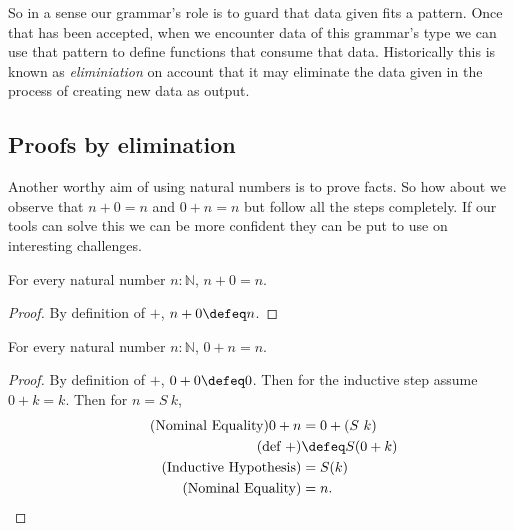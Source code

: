 So in a sense our grammar's role is to guard that data given fits 
a pattern.  Once that has been accepted, when we encounter data 
of this grammar's type we can use that pattern to define functions 
that consume that data.  Historically this is known as \emph{eliminiation}
on account that it may eliminate the data given in the process of 
creating new data as output.

\subsection{Proofs by elimination}
Another worthy aim of using natural numbers is to prove facts.
So how about we observe that $n+0=n$ and $0+n=n$ but follow all the steps 
completely.  If our tools can solve this we can be more confident they 
can be put to use on interesting challenges.

\begin{proposition}
    For every natural number $n:\mathbb{N}$, $n+0=n$.
\end{proposition}
\begin{proof}
    By definition of $+$, $n+0\defeq n$.
\end{proof}


\begin{proposition}
    For every natural number $n:\mathbb{N}$, $0+n=n$.
\end{proposition}
\begin{proof}
    By definition of $+$, $0+0\defeq 0$.
    Then for the inductive step assume 
    $0+k=k$.  Then for $n=S~k$, 
    \begin{align*}
        \tag{Nominal Equality}
        0+n & = 0+(S~k)\\
        \tag{def $+$}
        & \defeq S(0+k)\\
        \tag{Inductive Hypothesis}
        & =S(k)\\
        \tag{Nominal Equality}
        & =n.
\end{align*}
\end{proof}

